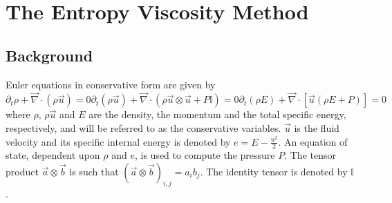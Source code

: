 \documentclass[review,10pt]{elsarticle}
\renewcommand{\div}{\vec{\nabla}\! \cdot \!}
\begin{document}
\section{The Entropy Viscosity Method} \label{sec:entro_visc}

\subsection{Background} \label{sec:background}

Euler equations in conservative form are given by
\begin{subequations}
\label{eq:euler_eq}
%
\begin{equation}
\partial_t \rho  + \div \left( \rho \vec{u} \right) = 0
\end{equation}
%
\begin{equation}
\partial_t \left( \rho \vec{u} \right) + \div \left( \rho \vec{u} \otimes \vec{u} + P \mathbb{I} \right) = 0 
\end{equation}
%
\begin{equation}
\partial_t \left( \rho E \right) + \div \left[ \vec{u} \left( \rho E + P \right) \right] = 0
\end{equation}
\end{subequations}
%
where $\rho$, $\rho \vec{u}$ and $E$ are the density, the momentum and the total specific energy, 
respectively, and will be referred to as the conservative variables. $\vec{u}$ is the fluid velocity and 
its specific internal energy is denoted by $e=E-\tfrac{u^2}{2}$. An equation of state, dependent upon 
$\rho$ and $e$, is used to compute the pressure $P$. The tensor product $\vec{a} \otimes \vec{b}$ is 
such that $(\vec{a} \otimes \vec{b})_{i,j} = a_i b_j$. The identity tensor is denoted by $\mathbb{I}$.
\end{document}
